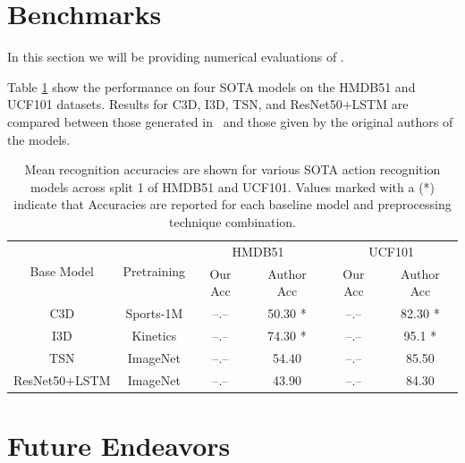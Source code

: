 \documentclass{llncs}
\begin{document}
\section{Benchmarks}
\label{sec:benchmarks}
In this section we will be providing numerical evaluations of \acro.

Table \ref{tab:model_results} show the performance on four SOTA models on the HMDB51 and UCF101 datasets.
Results for C3D, I3D, TSN, and ResNet50+LSTM are compared between those generated in \acro~and those given by the original authors of the models.

\begin{table}[h!]
\begin{center}
\caption{Mean recognition accuracies are shown for various SOTA action recognition models across split 1 of HMDB51 and UCF101.
Values marked with a (*) indicate that  
Accuracies are reported for each baseline model and preprocessing technique combination.}
\label{tab:model_results}
\begin{tabular}{c|c|c|c||c|c}
\hline
\multirow{2}{*}{Base Model} & \multirow{2}{*}{Pretraining} & \multicolumn{2}{c||}{HMDB51} & \multicolumn{2}{c}{UCF101} \\\cline{3-6}
& & Our Acc & Author Acc & Our Acc & Author Acc \\
\hline
C3D & Sports-1M & --.-- & 50.30 * & --.-- & 82.30 * \\
\hline
I3D & Kinetics & --.-- & 74.30 * & --.-- & 95.1 * \\
\hline
TSN & ImageNet & --.-- & 54.40 & --.-- & 85.50 \\
\hline
ResNet50+LSTM & ImageNet & --.-- & 43.90 & --.-- & 84.30 \\
\hline
\end{tabular}
\end{center}
\end{table}


\section{Future Endeavors}
\label{sec:future}


\clearpage



\end{document}
